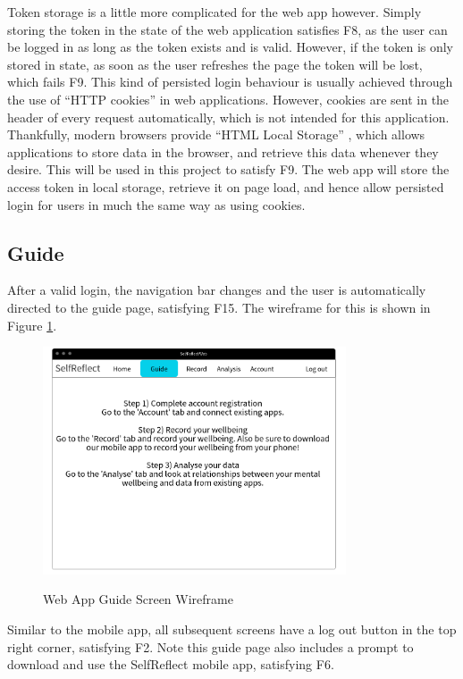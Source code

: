 \documentclass[11pt,openright,a4paper]{report}
\begin{document}
Token storage is a little more complicated for the web app however. Simply storing the token in the state of the web application satisfies F8, as the user can be logged in as long as the token exists and is valid. However, if the token is only stored in state, as soon as the user refreshes the page the token will be lost, which fails F9. This kind of persisted login behaviour is usually achieved through the use of \enquote{HTTP cookies} in web applications. However, cookies are sent in the header of every request automatically, which is not intended for this application. Thankfully, modern browsers provide \enquote{HTML Local Storage} \parencite{htmllocalstorage}, which allows applications to store data in the browser, and retrieve this data whenever they desire. This will be used in this project to satisfy F9. The web app will store the access token in local storage, retrieve it on page load, and hence allow persisted login for users in much the same way as using cookies.

\subsection{Guide}
After a valid login, the navigation bar changes and the user is automatically directed to the guide page, satisfying F15. The wireframe for this is shown in Figure \ref{fig:webguide}.

\begin{figure}[ht]
\centering
\caption{Web App Guide Screen Wireframe}
\includegraphics[width=0.8\textwidth]{i/webguide.png}
\label{fig:webguide}
\end{figure}

Similar to the mobile app, all subsequent screens have a log out button in the top right corner, satisfying F2. Note this guide page also includes a prompt to download and use the SelfReflect mobile app, satisfying F6.
\end{document}
